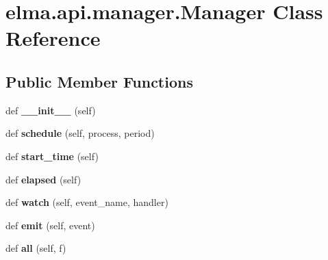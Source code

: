 \hypertarget{classelma_1_1api_1_1manager_1_1Manager}{}\section{elma.\+api.\+manager.\+Manager Class Reference}
\label{classelma_1_1api_1_1manager_1_1Manager}
\subsection*{Public Member Functions}
\begin{DoxyCompactItemize}
\item 
\mbox{\label{classelma_1_1api_1_1manager_1_1Manager_af6ea4ce84e82ccc172774bb1ded3d3b0}} 
def {\bfseries \+\_\+\+\_\+init\+\_\+\+\_\+} (self)
\item 
\mbox{\label{classelma_1_1api_1_1manager_1_1Manager_afa7d8aad0d3fb8bc2da697ee251d8f66}} 
def {\bfseries schedule} (self, process, period)
\item 
\mbox{\label{classelma_1_1api_1_1manager_1_1Manager_adfd5bd95cca1ebfba742319c1d01e4e2}} 
def {\bfseries start\+\_\+time} (self)
\item 
\mbox{\label{classelma_1_1api_1_1manager_1_1Manager_ad26dad0553c0e6936acbedba79b38bda}} 
def {\bfseries elapsed} (self)
\item 
\mbox{\label{classelma_1_1api_1_1manager_1_1Manager_a79300fdc4b141009a2c34648b566f216}} 
def {\bfseries watch} (self, event\+\_\+name, handler)
\item 
\mbox{\label{classelma_1_1api_1_1manager_1_1Manager_a8c842ef67392a11900ce089e05b23c58}} 
def {\bfseries emit} (self, event)
\item 
\mbox{\label{classelma_1_1api_1_1manager_1_1Manager_a4e451c5cd548a0086536fa9c990b338e}} 
def {\bfseries all} (self, f)
\item 
\mbox{\label{classelma_1_1api_1_1manager_1_1Manager_a724e1c80f53aff3430bc465a5671ddee}} 

\end{DoxyCompactItemize}

